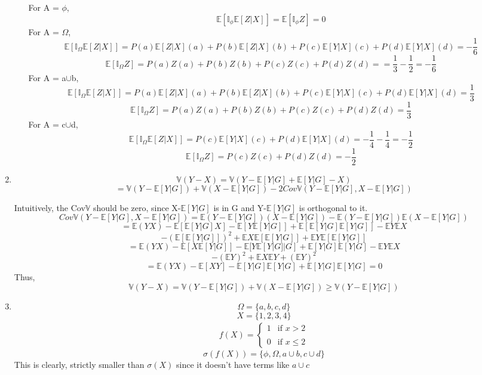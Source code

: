 \documentclass[a4paper,11pt]{article}
\begin{document}
\begin{enumerate}
\begin{enumerate}
For A = $\phi$,
\[\mathbb{E}[\mathbb{I}_\phi\mathbb{E}[Z|X]]=\mathbb{E}[\mathbb{I}_\phi Z] =0\]
For A = $\Omega$,
\[\mathbb{E}[\mathbb{I}_\Omega\mathbb{E}[Z|X]]=P(a)\mathbb{E}[Z|X](a)+ P(b)\mathbb{E}[Z|X](b) +P(c)\mathbb{E}[Y|X](c)+ P(d)\mathbb{E}[Y|X](d)=-\frac{1}{6}\]
\[\mathbb{E}[\mathbb{I}_\Omega Z] = P(a)Z(a) + P(b)Z(b)+ P(c)Z(c) + P(d)Z(d)= =\frac{1}{3}-\frac{1}{2}= -\frac{1}{6}\]
For A = a$\cup$b,
\[\mathbb{E}[\mathbb{I}_\Omega\mathbb{E}[Z|X]]=P(a)\mathbb{E}[Z|X](a)+ P(b)\mathbb{E}[Z|X](b) +P(c)\mathbb{E}[Y|X](c)+ P(d)\mathbb{E}[Y|X](d)=\frac{1}{3}\]
\[\mathbb{E}[\mathbb{I}_\Omega Z] = P(a)Z(a) + P(b)Z(b)+ P(c)Z(c) + P(d)Z(d) =\frac{1}{3}\]
For A = c$\cup$d,
\[\mathbb{E}[\mathbb{I}_\Omega\mathbb{E}[Z|X]] = P(c)\mathbb{E}[Y|X](c)+ P(d)\mathbb{E}[Y|X](d)=-\frac{1}{4}-\frac{1}{4}= -\frac{1}{2}\]
\[\mathbb{E}[\mathbb{I}_\Omega Z] = P(c)Z(c) + P(d)Z(d)= -\frac{1}{2}\]
\end{enumerate} 
\item
\[\mathbb{V}(Y-X)= \mathbb{V}(Y-\mathbb{E}[Y|G]+ \mathbb{E}[Y|G]-X)\]
\[= \mathbb{V}(Y-\mathbb{E}[Y|G]) + \mathbb{V}(X-\mathbb{E}[Y|G])-2Cov\mathbb{V}(Y-\mathbb{E}[Y|G], X-\mathbb{E}[Y|G])\]

Intuitively, the Cov$\mathbb{V}$ should be zero, since X-$\mathbb{E}[Y|G]$ is in G and Y-$\mathbb{E}[Y|G]$ is orthogonal to it.
\[Cov\mathbb{V}(Y-\mathbb{E}[Y|G], X-\mathbb{E}[Y|G])= \mathbb{E}(Y-\mathbb{E}[Y|G]) (X-\mathbb{E}[Y|G])-\mathbb{E}(Y-\mathbb{E}[Y|G]) \mathbb{E}(X-\mathbb{E}[Y|G]) \]
\[= \mathbb{E}(YX)-\mathbb{E}[\mathbb{E}[Y|G]X]-\mathbb{E}[Y\mathbb{E}[Y|G]]+\mathbb{E}[\mathbb{E}[Y|G]\mathbb{E}[Y|G]]-\mathbb{E}Y\mathbb{E}X \]
\[-(\mathbb{E}[\mathbb{E}[Y|G]])^2 +\mathbb{E}X\mathbb{E}[\mathbb{E}[Y|G]]  +\mathbb{E}Y\mathbb{E}[\mathbb{E}[Y|G]] \]
\[= \mathbb{E}(YX)-\mathbb{E}[X\mathbb{E}[Y|G]]-\mathbb{E}[Y\mathbb{E}[Y|G]|G]+\mathbb{E}[Y|G]\mathbb{E}[Y|G]-\mathbb{E}Y\mathbb{E}X \]
\[-(\mathbb{E}Y)^2 +\mathbb{E}X\mathbb{E}Y  +(\mathbb{E}Y)^2 \]
\[= \mathbb{E}(YX)-\mathbb{E}[XY]-\mathbb{E}[Y|G]\mathbb{E}[Y|G]+\mathbb{E}[Y|G]\mathbb{E}[Y|G] =0 \]
Thus,
\[\mathbb{V}(Y-X) = \mathbb{V}(Y-\mathbb{E}[Y|G]) + \mathbb{V}(X-\mathbb{E}[Y|G]) \geq\mathbb{V}(Y-\mathbb{E}[Y|G]) \]
\item
\[ \Omega =\{a,b,c,d\}\]
\[X = \{1,2,3,4\}\]
 \begin{align*}
  f(X)= \begin{cases}
      1 & \text{if $x>2$} \\
      \\ 0 & \text{if $x \leq 2$}
    \end{cases}
\end{align*}
\[\sigma(f(X))= \{\phi, \Omega, a\cup  b, c\cup d\}\]
This is clearly, strictly smaller than $\sigma(X)$ since it doesn't have terms like $a\cup c$
	

\end{enumerate}
\end{document}
